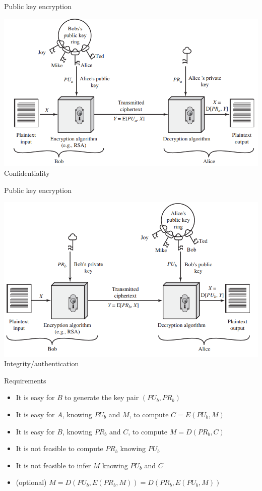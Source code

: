 \documentclass{beamer}
\begin{document}
\begin{frame}{Public key encryption}
  \begin{center}
    \includegraphics[width=0.8\linewidth]{public1}\\
    Confidentiality
  \end{center}
\end{frame}

\begin{frame}{Public key encryption}
  \begin{center}
    \includegraphics[width=0.8\linewidth]{public2}\\
  Integrity/authentication
  \end{center}
\end{frame}


\begin{frame}{Requirements}
  \begin{itemize}
    \item<1-> It is easy for $B$ to generate the key pair $(PU_b,PR_b)$
    \item<2-> It is easy for $A$, knowing $PU_b$ and $M$, to compute $C=E(PU_b, M)$ 
    \item<2-> It is easy for $B$, knowing $PR_b$ and $C$, to compute $M=D(PR_b, C)$ 
    \item<3-> It is not feasible to compute $PR_b$ knowing $PU_b$ 
    \item<3-> It is not feasible to infer $M$ knowing $PU_b$ and $C$
    \item<4-> (optional) $M=D(PU_b,E(PR_b,M))=D(PR_b,E(PU_b,M))$
  \end{itemize}
\end{frame}
 
\end{document}
